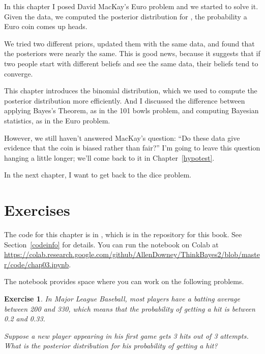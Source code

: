 \documentclass[12pt]{book}
\theoremstyle{exercise}
\newtheorem{exercise}{Exercise}[chapter]
\begin{document}
In this chapter I posed David MacKay's Euro problem and we started to solve it.
Given the data, we computed the posterior distribution for , the probability a Euro coin comes up heads.

We tried two different priors, updated them with the same data, and found that the posteriors were nearly the same.
This is good news, because it suggests that if two people start with different beliefs and see the same data, their beliefs tend to converge.

This chapter introduces the binomial distribution, which we used to compute the posterior distribution more efficiently.
And I discussed the difference between applying Bayes's Theorem, as in the 101 bowls problem, and computing Bayesian statistics, as in the Euro problem.


However, we still haven't answered MacKay's question: ``Do these data give evidence that the coin is biased rather than fair?''
I'm going to leave this question hanging a little longer; we'll come back to it in Chapter~\ref{hypotest}.

In the next chapter, I want to get back to the dice problem.

\section{Exercises}

The code for this chapter is in , which is in the repository for this book.  See Section~\ref{codeinfo} for details.
You can run the notebook on Colab at \url{https://colab.research.google.com/github/AllenDowney/ThinkBayes2/blob/master/code/chap03.ipynb}.

The notebook provides space where you can work on the following problems.


\begin{exercise}
In Major League Baseball, most players have a batting average between 200 and 330, which means that the probability of getting a hit is between 0.2 and 0.33.

Suppose a new player appearing in his first game gets 3 hits out of 3 attempts.  What is the posterior distribution for his probability of getting a hit?
\end{exercise}
\end{document}
